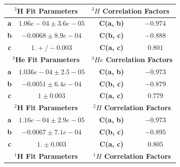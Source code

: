 \documentclass[final,5p,times,twocolumn,balance]{elsarticle}
\begin{document}
\begin{table}[!h]
\begin{tabular}{|c|c|l|c|c|l|}
\hline
\multicolumn{3}{|c|}{\textbf{$^{3}$H Fit Parameters}}                                & \multicolumn{3}{l|}{\textbf{$^{3}H$ Correlation Factors}}    \\ \hline
\textbf{a}              & \multicolumn{2}{c|}{$1.06e-04 \pm 3.6e-05$}                & \textbf{C(a, b)}             & \multicolumn{2}{c|}{$-0.974$} \\ \hline
\textbf{b}              & \multicolumn{2}{c|}{$-0.0068 \pm 8.9e-04$}                 & \textbf{C(b, c)}             & \multicolumn{2}{c|}{$-0.888$} \\ \hline
\textbf{c}              & \multicolumn{2}{c|}{$1. +/- 0.003$}                        & \textbf{C(a, c)}             & \multicolumn{2}{c|}{$0.801$}  \\ \hline
\multicolumn{3}{|c|}{\textbf{$^{3}$He Fit Parameters}}                               & \multicolumn{3}{c|}{\textbf{$^{3}He$ Correlation Factors}}   \\ \hline
\textbf{a}              & \multicolumn{2}{c|}{$1.036e-04\pm 2.5-05$}                 & \textbf{C(a, b)}                      & \multicolumn{2}{c|}{$-0.973$} \\ \hline
\textbf{b}              & \multicolumn{2}{c|}{$-0.0051 \pm 6.4e-04$}                 & \textbf{C(b, c)}                      & \multicolumn{2}{c|}{$-0.879$} \\ \hline
\textbf{c}              & \multicolumn{2}{c|}{$1 \pm 0.003$}                         & \textbf{C(a, c)}                     & \multicolumn{2}{c|}{$0.779$}  \\ \hline
\multicolumn{3}{|c|}{\textbf{$^{2}$H Fit Parameters}}                                & \multicolumn{3}{c|}{\textbf{$^{2}H$ Correlation Factors}}    \\ \hline
\textbf{a}              & \multicolumn{2}{c|}{$1.16e-04 \pm 2.9e-05$} & \textbf{C(a, b)}             & \multicolumn{2}{c|}{$-0.973$} \\ \hline
\textbf{b}              & \multicolumn{2}{c|}{$-0.0067 \pm 7.1e-04$}                 & \textbf{C(b, c)}             & \multicolumn{2}{c|}{$-0.895$} \\ \hline
\textbf{c}              & \multicolumn{2}{c|}{$1. \pm 0.003$}                        & \textbf{C(a, c)}             & \multicolumn{2}{c|}{$0.805$}  \\ \hline
\multicolumn{3}{|c|}{\textbf{$^{1}$H Fit Parameters}}                                & \multicolumn{3}{c|}{\textbf{$^{1}H$ Correlation Factors}}    \\ \hline

\end{tabular}
\end{table}
\end{document}

